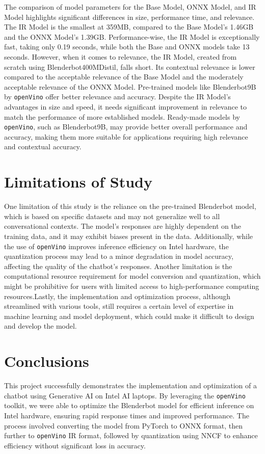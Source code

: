 \documentclass{josis}
\begin{document}
The comparison of model parameters for the Base Model, ONNX Model, and IR Model highlights significant differences in size, performance time, and relevance. The IR Model is the smallest at 359MB, compared to the Base Model's 1.46GB and the ONNX Model's 1.39GB. Performance-wise, the IR Model is exceptionally fast, taking only 0.19 seconds, while both the Base and ONNX models take 13 seconds. However, when it comes to relevance, the IR Model, created from scratch using Blenderbot400MDistil, falls short. Its contextual relevance is lower compared to the acceptable relevance of the Base Model and the moderately acceptable relevance of the ONNX Model. Pre-trained models like Blenderbot9B by \texttt{openVino} offer better relevance and accuracy. Despite the IR Model's advantages in size and speed, it needs significant improvement in relevance to match the performance of more established models. Ready-made models by \texttt{openVino}, such as Blenderbot9B, may provide better overall performance and accuracy, making them more suitable for applications requiring high relevance and contextual accuracy.

\section{Limitations of Study}
One limitation of this study is the reliance on the pre-trained Blenderbot model, which is based on specific datasets and may not generalize well to all conversational contexts. The model's responses are highly dependent on the training data, and it may exhibit biases present in the data. Additionally, while the use of \texttt{openVino} improves inference efficiency on Intel hardware, the quantization process may lead to a minor degradation in model accuracy, affecting the quality of the chatbot's responses. Another limitation is the computational resource requirement for model conversion and quantization, which might be prohibitive for users with limited access to high-performance computing resources.Lastly, the implementation and optimization process, although streamlined with various tools, still requires a certain level of expertise in machine learning and model deployment, which could make it difficult to design and develop the model.

\section{Conclusions}
This project successfully demonstrates the implementation and optimization of a chatbot using Generative AI on Intel AI laptops. By leveraging the \texttt{openVino} toolkit, we were able to optimize the Blenderbot model for efficient inference on Intel hardware, ensuring rapid response times and improved performance. The process involved converting the model from PyTorch to ONNX format, then further to \texttt{openVino} IR format, followed by quantization using NNCF to enhance efficiency without significant loss in accuracy.
\end{document}
